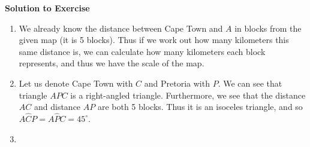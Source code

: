 {\begin{mdframed}[linewidth=4, leftmargin=40, rightmargin=40]
\begin{exercise}
        \par 
        
        \vspace{5pt}
        \label{m39411*solfhsst!!!underscore!!!id1611}\noindent\textbf{Solution to Exercise } \label{m39411*listfhsst!!!underscore!!!id1611}\begin{enumerate}[noitemsep, label=\textbf{Step} \textbf{\arabic*}. ] 
            \leftskip=20pt\rightskip=\leftskip\item  
        \label{m39411*id82688}We already know the distance between Cape Town and \begin{math}A\end{math} in blocks from the given map (it is 5 blocks). Thus if we work out how many kilometers this same distance is, we can calculate how many kilometers each block represents, and thus we have the scale of the map.\par 
        \item  
        \label{m39411*id82707}Let us denote Cape Town with \begin{math}C\end{math} and Pretoria with \begin{math}P\end{math}.
We can see that triangle \begin{math}APC\end{math} is a right-angled triangle. Furthermore, we see that the distance \begin{math}AC\end{math} and distance \begin{math}AP\end{math} are both 5 blocks. Thus it is an isoceles triangle, and so \begin{math}A\hat{C}P=A\hat{P}C={45}^{\circ }\end{math}.\par 
        \item  
        \label{m39411*id82816}\nopagebreak\noindent{}
\end{enumerate}
\end{exercise}
\end{mdframed}}
